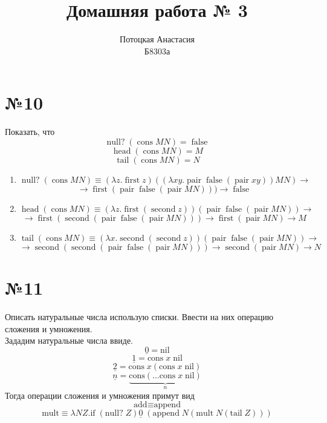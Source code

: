 \documentclass[a4paper,14pt]{scrreprt}
\title{Домашняя работа № 3}
\author{Потоцкая Анастасия\\Б8303а}
\newcommand{\lmd}{\lambda}
\DeclareMathOperator{\false}{false}
\DeclareMathOperator{\pair}{pair}
\DeclareMathOperator{\mnull}{null?}
\DeclareMathOperator{\mcons}{cons}
\DeclareMathOperator{\mhead}{head}
\DeclareMathOperator{\mtail}{tail}
\DeclareMathOperator{\mfirst}{first}
\DeclareMathOperator{\msecond}{second}
\begin{document}
\maketitle

\section*{№10}
Показать, что   
$$ \mnull (\mcons M N)= \false $$
$$\mhead  (\mcons M N)= M$$
$$\mtail(\mcons M N)=N$$

\begin{enumerate}
\item 
$$ \mnull (\mcons M N) \equiv (\lmd z.\mfirst z)((\lmd xy. \pair \false (\pair xy)) M N) \to $$
$$ \to \mfirst (\pair \false (\pair M N))) \to \false $$
\item 
$$\mhead  (\mcons M N) \equiv (\lmd z. \mfirst(\msecond z)) (\pair \false (\pair MN)) \to  $$
$$ \to \mfirst(\msecond (\pair \false (\pair MN)) ) \to \mfirst (\pair MN) \to M $$ 
\item 
$$ \mtail(\mcons M N) \equiv (\lmd x. \msecond (\msecond z)) (\pair \false (\pair MN)) \to $$
$$ \to \msecond (\msecond (\pair \false (\pair MN))) \to \msecond (\pair MN) \to N $$
\end{enumerate}

\section*{№11}
Описать натуральные числа использую списки. Ввести на них операцию сложения и умножения. \\
Зададим натуральные числа ввиде.
$$ \underline{0} = \text{nil} $$
$$ \underline{1} = \text{cons} \; x \; \text{nil} $$
$$ \underline{2} = \text{cons} \; x (\text{cons} \; x \;  \text{nil}) $$
$$ \underline{n} = \underbrace{\text{cons} (\dots \text{cons} \; x \; \text{nil})}_{n}  $$ 
Тогда операции сложения и умножения примут вид
$$ \text{add} \equiv \text{append} $$
$$ \text{mult} \equiv \lmd NZ. \text{if} \; (\text{null?} \; Z) \underline{0}\; (\text{append}\; N (\text{mult}\; N (\text{tail}\; Z))   ) $$ 
\end{document}

